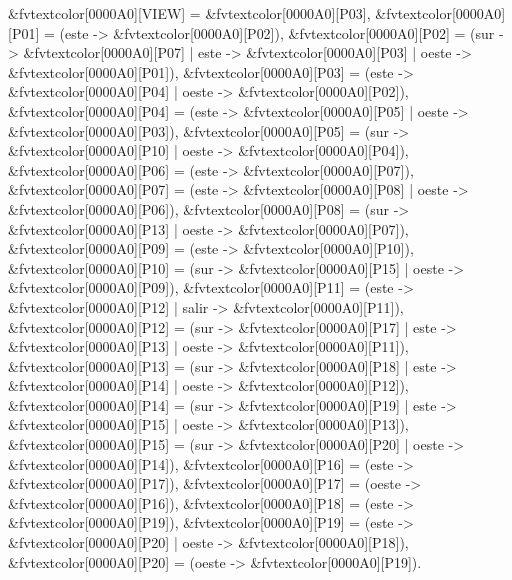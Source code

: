 \begin{Code}[commandchars=&\[\]]
&fvtextcolor[0000A0][VIEW] = &fvtextcolor[0000A0][P03],
&fvtextcolor[0000A0][P01] = (este  -> &fvtextcolor[0000A0][P02]),
&fvtextcolor[0000A0][P02] = (sur   -> &fvtextcolor[0000A0][P07] | este  -> &fvtextcolor[0000A0][P03] | oeste -> &fvtextcolor[0000A0][P01]),
&fvtextcolor[0000A0][P03] = (este  -> &fvtextcolor[0000A0][P04] | oeste -> &fvtextcolor[0000A0][P02]),
&fvtextcolor[0000A0][P04] = (este  -> &fvtextcolor[0000A0][P05] | oeste -> &fvtextcolor[0000A0][P03]),
&fvtextcolor[0000A0][P05] = (sur   -> &fvtextcolor[0000A0][P10] | oeste -> &fvtextcolor[0000A0][P04]),
&fvtextcolor[0000A0][P06] = (este  -> &fvtextcolor[0000A0][P07]),
&fvtextcolor[0000A0][P07] = (este  -> &fvtextcolor[0000A0][P08] | oeste -> &fvtextcolor[0000A0][P06]),
&fvtextcolor[0000A0][P08] = (sur   -> &fvtextcolor[0000A0][P13] | oeste -> &fvtextcolor[0000A0][P07]),
&fvtextcolor[0000A0][P09] = (este  -> &fvtextcolor[0000A0][P10]),
&fvtextcolor[0000A0][P10] = (sur   -> &fvtextcolor[0000A0][P15] | oeste -> &fvtextcolor[0000A0][P09]),
&fvtextcolor[0000A0][P11] = (este  -> &fvtextcolor[0000A0][P12] | salir -> &fvtextcolor[0000A0][P11]),
&fvtextcolor[0000A0][P12] = (sur   -> &fvtextcolor[0000A0][P17] | este  -> &fvtextcolor[0000A0][P13] | oeste -> &fvtextcolor[0000A0][P11]),
&fvtextcolor[0000A0][P13] = (sur   -> &fvtextcolor[0000A0][P18] | este  -> &fvtextcolor[0000A0][P14] | oeste -> &fvtextcolor[0000A0][P12]),
&fvtextcolor[0000A0][P14] = (sur   -> &fvtextcolor[0000A0][P19] | este  -> &fvtextcolor[0000A0][P15] | oeste -> &fvtextcolor[0000A0][P13]),
&fvtextcolor[0000A0][P15] = (sur   -> &fvtextcolor[0000A0][P20] | oeste -> &fvtextcolor[0000A0][P14]),
&fvtextcolor[0000A0][P16] = (este  -> &fvtextcolor[0000A0][P17]),
&fvtextcolor[0000A0][P17] = (oeste -> &fvtextcolor[0000A0][P16]),
&fvtextcolor[0000A0][P18] = (este  -> &fvtextcolor[0000A0][P19]),
&fvtextcolor[0000A0][P19] = (este  -> &fvtextcolor[0000A0][P20] | oeste -> &fvtextcolor[0000A0][P18]),
&fvtextcolor[0000A0][P20] = (oeste -> &fvtextcolor[0000A0][P19]).


\end{Code}
